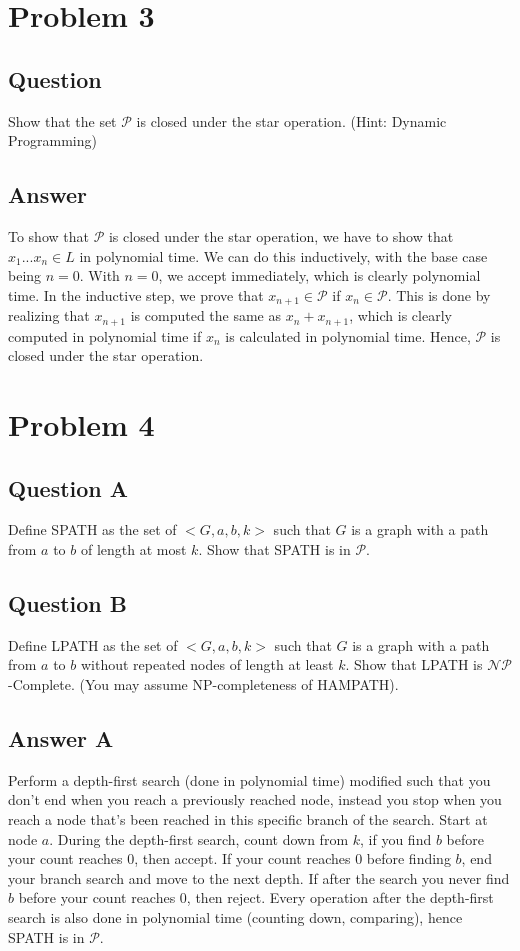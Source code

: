 \documentclass[12pt, a4paper]{article}
\begin{document}
\section{Problem 3}
\subsection{Question}
Show that the set $\mathcal{P}$ is closed under the star operation. (Hint: Dynamic Programming)
\subsection{Answer}
To show that $\mathcal{P}$ is closed under the star operation, we have to show that $x_{1}... x_{n} \in L$ in polynomial time. We can do this inductively, with the base case being $n=0$. With $n=0$, we accept immediately, which is clearly polynomial time. In the inductive step, we prove that $x_{n+1} \in \mathcal{P}$ if $x_{n} \in \mathcal{P}$. This is done by realizing that $x_{n+1}$ is computed the same as $x_{n} + x_{n+1}$, which is clearly computed in polynomial time if $x_{n}$ is calculated in polynomial time. Hence, $\mathcal{P}$ is closed under the star operation.

\section{Problem 4}
\subsection{Question A}
Define SPATH as the set of $<G, a, b, k>$ such that $G$ is a graph with a path from $a$ to $b$ of length at most $k$. Show that SPATH is in $\mathcal{P}$.
\subsection{Question B}
Define LPATH as the set of $<G,a,b,k>$ such that $G$ is a graph with a path from $a$ to $b$ without repeated nodes of length at least $k$. Show that LPATH is $\mathcal{NP}$-Complete. (You may assume NP-completeness of 
HAMPATH).
\subsection{Answer A}
Perform a depth-first search (done in polynomial time) modified such that you don't end when you reach a previously reached node, instead you stop when you reach a node that's been reached in this specific branch of the search. Start at node $a$. During the depth-first search, count down from $k$, if you find $b$ before your count reaches 0, then accept. If your count reaches 0 before finding $b$, end your branch search and move to the next depth. If after the search you never find $b$ before your count reaches 0, then reject. Every operation after the depth-first search is also done in polynomial time (counting down, comparing), hence SPATH is in $\mathcal{P}$.
\end{document}
